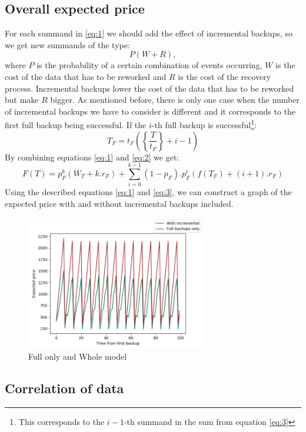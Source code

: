 \documentclass[11pt, a4paper]{article}
\theoremstyle{definition}
\begin{document}
		\subsection{Overall expected price}
		For each summand in \ref{eq:1} we should add the effect of incremental backups, so we get new summands of the type:
		$$
		P(W + R),
		$$
		where $P$ is the probability of a certain combination of events occurring, $W$ is the cost of the data that has to be reworked and $R$ is the cost of the recovery process. Incremental backups lower the cost of the data that has to be reworked but make $R$ bigger. As mentioned before, there is only one case when the number of incremental backups we have to consider is different and it corresponds to the first full backup being successful. If the $i$-th full backup is successful\footnote{This corresponds to the $i-1$-th summand in the sum from equation \ref{eq:3}}:
		$$
		T_F=t_F\left(\left\{ \frac{T}{t_F} \right\} + i - 1\right)
		$$
		By combining equations \ref{eq:1} and \ref{eq:2} we get:
		\begin{equation}\label{eq:3}
			F(T) = p_F^{k}(W_T+k.r_F) + \displaystyle\sum_{i=0}^{k-1}(1-p_F).p_F^{i}\left(f(T_F) + (i+1).r_F\right)
		\end{equation}
		Using the described equations \ref{eq:1} and \ref{eq:3}, we can construct a graph of the expected price with and without incremental backups included.
		\begin{figure}[H]
			\begin{minipage}{1.0\textwidth}
				\centering
				\includegraphics[width=0.7\textwidth]{"Weekly_full"}
				\caption{Full only and Whole model}\label{Fig:FullWeekly}
			\end{minipage}
		\end{figure}
		\subsection{Correlation of data}
\end{document}
